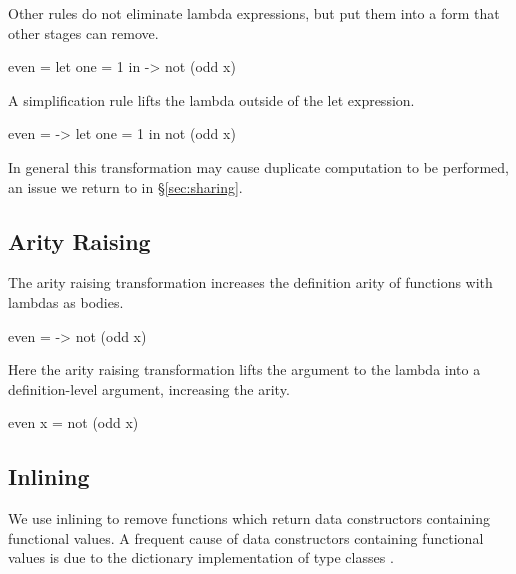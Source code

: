 \documentclass[preprint]{sigplanconf}
\begin{document}
Other rules do not eliminate lambda expressions, but put them into a form that other stages can remove.

\begin{example}
\begin{code}
even =  let one = 1
        in \x -> not (odd x)
\end{code}

A simplification rule lifts the lambda outside of the let expression.

\begin{code}
even = \x ->  let one = 1
              in not (odd x)
\end{code}

In general this transformation may cause duplicate computation to be performed, an issue we return to in \S\ref{sec:sharing}.
\end{example}


\subsection{Arity Raising}

The arity raising transformation increases the definition arity of functions with lambdas as bodies.

\begin{example}
\begin{code}
even = \x -> not (odd x)
\end{code}

Here the arity raising transformation lifts the argument to the lambda into a definition-level argument, increasing the arity.

\begin{code}
even x = not (odd x)
\end{code}
\end{example}


\subsection{Inlining}

We use inlining to remove functions which return data constructors containing functional values. A frequent cause of data constructors containing functional values is due to the dictionary implementation of type classes \cite{wadler:type_classes}.
\end{document}
